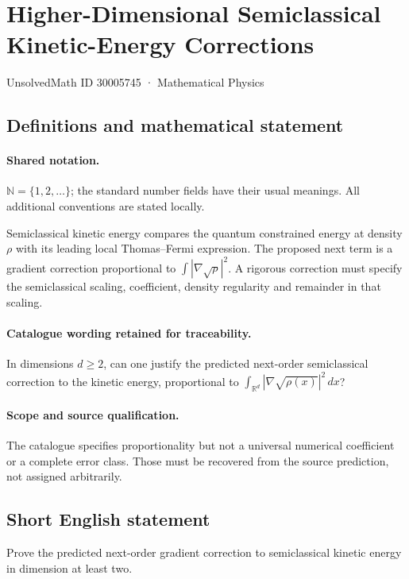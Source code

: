 \documentclass[11pt]{article}
\begin{document}
\setcounter{section}{30005744}
\section{Higher-Dimensional Semiclassical Kinetic-Energy Corrections}\label{30005745}
{\small UnsolvedMath ID 30005745 · Mathematical Physics}
\subsection{Definitions and mathematical statement}

\paragraph{Shared notation.}$\mathbb N=\{1,2,\ldots\}$; the standard number fields have their usual meanings. All additional conventions are stated locally.


Semiclassical kinetic energy compares the quantum constrained energy at density $\rho$ with its leading local Thomas--Fermi expression. The proposed next term is a gradient correction proportional to $\int|\nabla\sqrt\rho|^2$. A rigorous correction must specify the semiclassical scaling, coefficient, density regularity and remainder in that scaling.

\paragraph{Catalogue wording retained for traceability.}
In dimensions $d\geq2$, can one justify the predicted next-order semiclassical correction to the kinetic energy, proportional to $\int_{\mathbb{R}^d}|\nabla\sqrt{\rho(x)}|^2\,dx$?

\paragraph{Scope and source qualification.}The catalogue specifies proportionality but not a universal numerical coefficient or a complete error class. Those must be recovered from the source prediction, not assigned arbitrarily.
\subsection{Short English statement}
Prove the predicted next-order gradient correction to semiclassical kinetic energy in dimension at least two.
\end{document}
